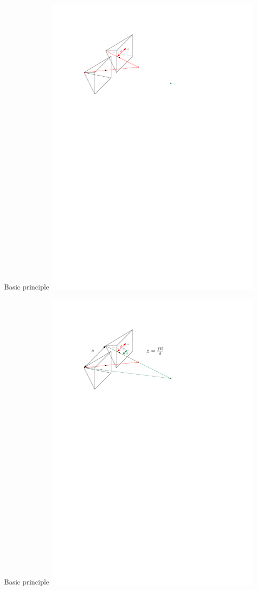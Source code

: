 \documentclass[aspectratio=169]{beamer}
\begin{document}
\begin{frame}{Basic principle}
    \includegraphics[width=0.8\textwidth]{images/stereo_1.pdf}
\end{frame}

\begin{frame}{Basic principle}
    \includegraphics[width=0.8\textwidth]{images/stereo_2.pdf}
\end{frame}
\end{document}
